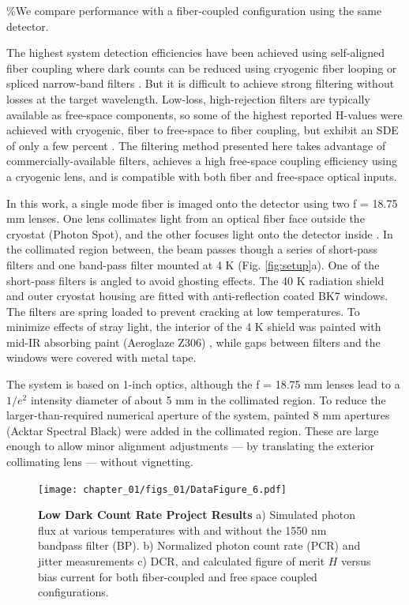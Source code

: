\documentclass[12pt]{caltech_thesis}
\begin{document}
\%We compare performance with a fiber-coupled configuration using the
same detector.

The highest system detection efficiencies have been achieved using
self-aligned fiber coupling where dark counts can be reduced using
cryogenic fiber looping \autocite{Cohen2015} or spliced narrow-band
filters \autocite{Boaron2018secure}. But it is difficult to achieve
strong filtering without losses at the target wavelength. Low-loss,
high-rejection filters are typically available as free-space components,
so some of the highest reported H-values were achieved with cryogenic,
fiber to free-space to fiber coupling, but exhibit an SDE of only a few
percent \autocite{Shibata2015}. The filtering method presented here
takes advantage of commercially-available filters, achieves a high
free-space coupling efficiency using a cryogenic lens, and is compatible
with both fiber and free-space optical inputs.

In this work, a single mode fiber is imaged onto the detector using two
f = 18.75 mm lenses. One lens collimates light from an optical fiber
face outside the cryostat (Photon Spot), and the other focuses light
onto the detector inside \autocite{Bellei:16}. In the collimated region
between, the beam passes though a series of short-pass filters and one
band-pass filter mounted at 4 K (Fig. \ref{fig:setup}a). One of the
short-pass filters is angled to avoid ghosting effects. The 40 K
radiation shield and outer cryostat housing are fitted with
anti-reflection coated BK7 windows. The filters are spring loaded to
prevent cracking at low temperatures. To minimize effects of stray
light, the interior of the 4 K shield was painted with mid-IR absorbing
paint (Aeroglaze Z306) \autocite{Persky1999}, while gaps between filters
and the windows were covered with metal tape.

The system is based on 1-inch optics, although the f = 18.75 mm lenses
lead to a \(1/e^2\) intensity diameter of about 5 mm in the collimated
region. To reduce the larger-than-required numerical aperture of the
system, painted 8 mm apertures (Acktar Spectral Black) were added in the
collimated region. These are large enough to allow minor alignment
adjustments --- by translating the exterior collimating lens --- without
vignetting.

\hypertarget{fig:dcrmin_data}{%
\begin{figure}
\centering
\texttt{[image: chapter\_01/figs\_01/DataFigure\_6.pdf]}
\caption[{Low Dark Count Rate Project Results.}]{\textbf{Low Dark Count
Rate Project Results} a) Simulated photon flux at various temperatures
with and without the 1550 nm bandpass filter (BP). b) Normalized photon
count rate (PCR) and jitter measurements c) DCR, and calculated figure
of merit \(H\) versus bias current for both fiber-coupled and free space
coupled configurations.}
\label{fig:dcrmin_data}
\end{figure}
}
\end{document}
